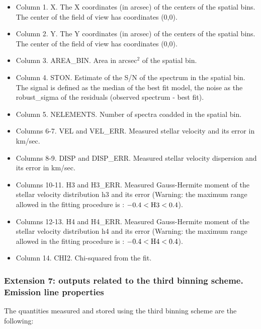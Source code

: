 \begin{itemize}

\item Column 1. X. The X coordinates (in arcsec) of the centers of the spatial bins. The center of the field of view has coordinates (0,0).
\item Column 2. Y. The Y coordinates (in arcsec) of the centers of the spatial bins. The center of the field of view has coordinates (0,0).
\item Column 3. AREA\_BIN. Area in arcsec$^2$ of the spatial bin.
\item Column 4. STON. Estimate of the S/N of the spectrum in the
  spatial bin. The signal is defined as the median of the best fit
  model, the noise as the robust\_sigma of the residuals (observed
  spectrum - best fit).
\item Column 5. NELEMENTS. Number of spectra coadded in the spatial bin.
\item Columns 6-7. VEL and VEL\_ERR. Measured stellar velocity and its error in km/sec.
\item Columns 8-9. DISP and DISP\_ERR. Measured stellar velocity dispersion and its error in km/sec.
\item Columns 10-11. H3 and H3\_ERR. Measured Gauss-Hermite moment of the stellar velocity distribution h3 and its error (Warning: the maximum range allowed in the
  fitting procedure is : $-0.4 < {\rm H3} < 0.4$).
\item Columns 12-13. H4 and H4\_ERR. Measured Gauss-Hermite moment of the stellar velocity distribution h4 and its error (Warning: the maximum range allowed in the
  fitting procedure is : $-0.4 < {\rm H4} < 0.4$).
\item Column 14. CHI2. Chi-squared from the fit.
\end{itemize}

\subsubsection{Extension 7: outputs related to the third binning
  scheme. Emission line properties} 


The quantities measured and stored using the third binning scheme are
the following:


